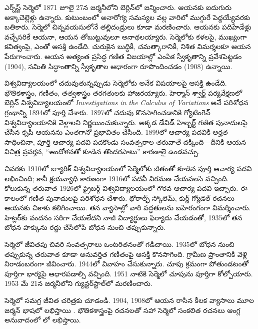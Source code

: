 \documentclass[../../../include/open-logic-section]{subfiles}
\begin{document}



ఎర్న్‌స్ట్ సెర్మెలో 1871 జూలై 27న జర్మనీలోని బెర్లిన్‌లో జన్మించారు. ఆయనకు ఐదుగురు అక్కాచెల్లెళ్లు ఉన్నారు. కుటుంబంలో అనారోగ్య సమస్యల వల్ల వారిలో ముగ్గురే పెద్దయ్యేవరకు బతికారు. సెర్మెలో చిన్నవయసులోనే తల్లిదండ్రులు కూడా మరణించారు. ఆయనకు పదిహేడేళ్లు వచ్చేసరికే ఆయనా, ఆయన తోబుట్టువులూ అనాథలయ్యారు. సెర్మెలోకు కళలపై, ముఖ్యంగా కవిత్వంపై, ఎంతో ఆసక్తి ఉండేది. చురుకైన బుద్ధికీ, చమత్కారానికీ, నిశిత విమర్శలకూ ఆయన పేరుగాంచారు. ఆయన అత్యంత ప్రసిద్ధ గణిత విజయాల్లో ఎంపిక స్వీకృతాన్ని ప్రవేశపెట్టడం (1904), సమితి సిద్ధాంతాన్ని స్వీకృతాల ఆధారంగా రూపొందించడం (1908) ఉన్నాయి.

విశ్వవిద్యాలయంలో చదువుతున్నప్పుడు సెర్మెలోకు అనేక విషయాలపై ఆసక్తి ఉండేది. భౌతికశాస్త్రం, గణితం, తత్వశాస్త్రం తరగతులకు హాజరయ్యారు. హెర్మాన్ శ్వార్జ్ పర్యవేక్షణలో బెర్లిన్ విశ్వవిద్యాలయంలో \emph{Investigations in
  the Calculus of Variations} అనే పరిశోధన గ్రంథాన్ని 1894లో పూర్తి చేశారు. 1897లో చదువు కొనసాగించడానికి గ్యోటింగెన్ విశ్వవిద్యాలయానికి వెళ్లాలని నిర్ణయించుకున్నారు. అక్కడ డేవిడ్ హిల్బర్ట్ గణిత పునాదులపై చేసిన కృషి ఆయనను ఎంతగానో ప్రభావితం చేసింది. 1899లో ఆచార్య పదవికి అర్హత సాధించినా, పూర్తి ఆచార్య పదవి పదకొండు సంవత్సరాల తరువాతే దక్కింది---దీనికి ఆయన విచిత్ర ప్రవర్తన, ``ఆందోళనతో కూడిన తొందరపాటు'' కారణాలై ఉండవచ్చు.

చివరకు 1910లో జ్యూరిక్ విశ్వవిద్యాలయంలో సెర్మెలోకు జీతంతో కూడిన పూర్తి ఆచార్య పదవి లభించింది; కానీ క్షయవ్యాధి కారణంగా 1916లో పదవీ విరమణ చేయవలసి వచ్చింది. కోలుకున్న తరువాత 1926లో ఫ్రైబర్గ్ విశ్వవిద్యాలయంలో గౌరవ ఆచార్య పదవి ఇచ్చారు. ఈ కాలంలో గణిత పునాదులపై పరిశోధన చేశారు. థోరాల్ఫ్ స్కోలెమ్, కుర్ట్ గ్యోడెల్ రచనలు ఆయనకు చికాకు కలిగించాయి. తన వ్యాసాల్లో వారి పద్ధతులను బహిరంగంగా విమర్శించారు. హిట్లర్‌కు వందనం సరిగా చేయలేదని నాజీ విద్యార్థులు ఫిర్యాదు చేయడంతో, 1935లో తన బోధన హక్కును రద్దు చేసేలోపే బోధన నుంచి తప్పుకున్నారు.
 
సెర్మెలో జీవితపు చివరి సంవత్సరాలు ఒంటరితనంతో గడిచాయి. 1935లో బోధన నుంచి తప్పుకున్న తరువాత కూడా అనువర్తిత గణితంపై ఆసక్తి కొనసాగింది. గ్రామీణ ప్రాంతానికి వెళ్లి నిరాడంబరంగా జీవించారు. 1944లో వివాహం చేసుకున్నారు. చూపు క్రమంగా పోతుండటంతో పూర్తిగా భార్యపై ఆధారపడాల్సి వచ్చింది. 1951 నాటికి సెర్మెలో చూపును పూర్తిగా కోల్పోయారు. 1953 మే 21న జర్మనీలోని గ్యున్టర్‌స్టాల్‌లో మరణించారు.

\begin{reading}
సెర్మెలో సమగ్ర జీవిత చరిత్రకు \citet{Ebbinghaus2015} చూడండి. 1904, 1908లో ఆయన రాసిన కీలక వ్యాసాలు మూల జర్మన్ భాషలో లభిస్తాయి \citep{Zermelo1904,Zermelo1908}. భౌతికశాస్త్రంపై రచనలతో సహా సెర్మెలో సంకలిత రచనలు ఆంగ్ల అనువాదంలో \citep{Ebbinghaus2010,Ebbinghaus2013}లో లభిస్తాయి.
\end{reading}
\end{document}
